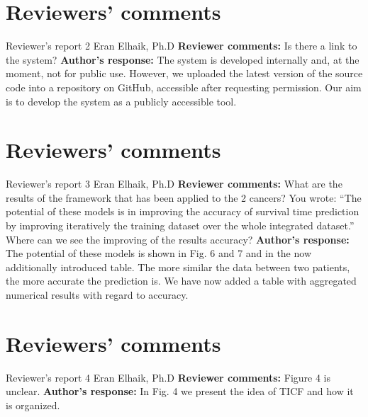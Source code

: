 \documentclass{bmcart}
\begin{document}
\begin{backmatter}
\section*{Reviewers' comments}
\newline Reviewer's report 2
\newline Eran Elhaik, Ph.D
\newline \textbf{Reviewer comments:}
Is there a link to the system?
\newline \textbf{Author's response:}
The system is developed internally and, at the moment, not for public use. However, we uploaded the latest version of the source code into a repository on GitHub, accessible after requesting permission. Our aim is to develop the system as a publicly accessible tool.

\section*{Reviewers' comments}
\newline Reviewer's report 3
\newline Eran Elhaik, Ph.D
\newline \textbf{Reviewer comments:}
What are the results of the framework that has been applied to the 2 cancers? You wrote: “The potential of these models is in improving the accuracy of survival time prediction by improving iteratively the training dataset over the whole integrated dataset.” Where can we see the improving of the results accuracy?
\newline \textbf{Author's response:}
The potential of these models is shown in Fig. 6 and 7 and in the now additionally introduced table. The more similar the data between two patients, the more accurate the prediction is. We have now added a table with aggregated numerical results with regard to accuracy.

\section*{Reviewers' comments}
\newline Reviewer's report 4
\newline Eran Elhaik, Ph.D
\newline \textbf{Reviewer comments:}
Figure 4 is unclear.
\newline \textbf{Author's response:}
In Fig. 4 we present the idea of TICF and how it is organized.


\end{backmatter}
\end{document}
